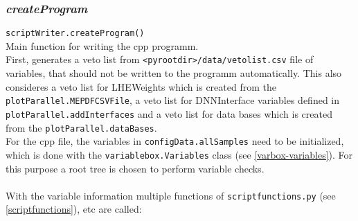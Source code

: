 \documentclass[12pt, a4paper]{article}
\begin{document}
\subsubsection{\textit{createProgram}}
\texttt{scriptWriter.createProgram()}\\
Main function for writing the cpp programm.\\
First, generates a veto list from \texttt{<pyrootdir>/data/vetolist.csv} file of variables, that should not be written to the programm automatically. This also consideres a veto list for LHEWeights which is created from the \texttt{plotParallel.MEPDFCSVFile}, a veto list for DNNInterface variables defined in \texttt{plotParallel.addInterfaces} and a veto list for data bases which is created from the \texttt{plotParallel.dataBases}.\\
For the cpp file, the variables in \texttt{configData.allSamples} need to be initialized, which is done with the \texttt{variablebox.Variables} class (see \ref{varbox-variables}). For this purpose a root tree is chosen to perform variable checks.\\
~\\
With the variable information multiple functions of \texttt{scriptfunctions.py} (see \ref{scriptfunctions}), etc are called:
\end{document}
